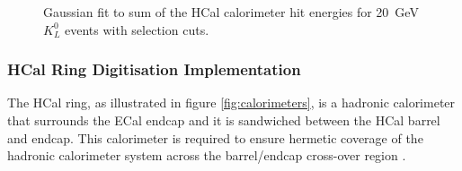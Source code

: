 \begin{figure}[h!]
\caption[Gaussian fit to sum of the HCal calorimeter hit energies for 20~GeV $K^{0}_{L}$ events with selection cuts.]{Gaussian fit to sum of the HCal calorimeter hit energies for 20~GeV $K^{0}_{L}$ events with selection cuts.}
\label{fig:hcaldigifit}
\end{figure}


\subsubsection{HCal Ring Digitisation Implementation}
\label{sec:hcalringdigi}
The HCal ring, as illustrated in figure \ref{fig:calorimeters}, is a hadronic calorimeter that surrounds the ECal endcap and it is sandwiched between the HCal barrel and endcap.  This calorimeter is required to ensure hermetic coverage of the hadronic calorimeter system across the barrel/endcap cross-over region \cite{Behnke:2013lya}.  

